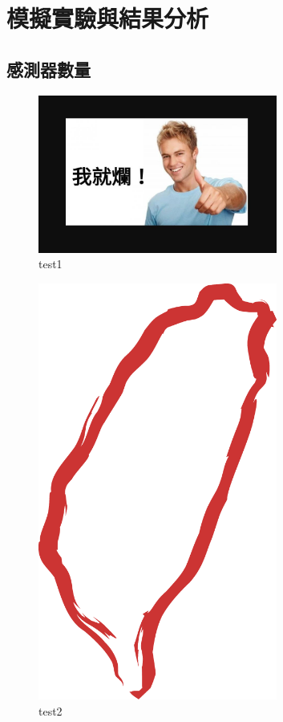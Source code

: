 \chapter{模擬實驗與結果分析}\label{Experimental_results}


\section{感測器數量}


\begin{figure}[H] 
    \centering 
    \includegraphics[width=0.7\textwidth]{./Figures/ImageTest/123.JPG} 
    \caption{test1} 
    \label{fig_good}
\end{figure}

\begin{figure}[H] 
    \centering 
    \includegraphics[width=0.7\textwidth]{./Figures/ImageTest/Taiwan_symbol.png} 
    \caption{test2} 
\end{figure}

